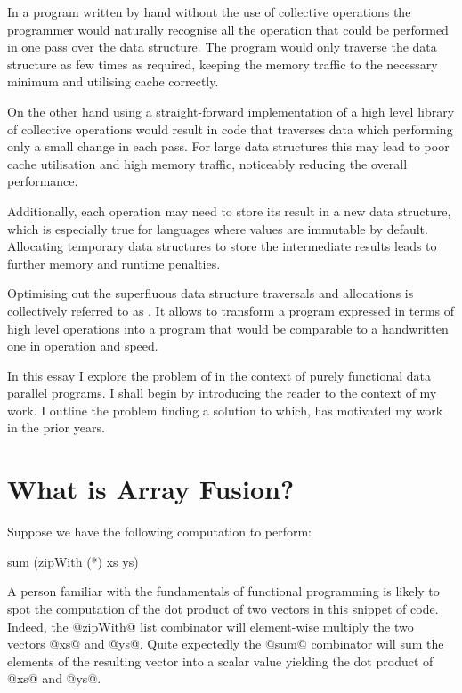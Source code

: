 \documentclass[preamble.tex]{subfiles}
\begin{document}
In a program written by hand without the use of collective operations the programmer would naturally recognise all the operation that could be performed in one pass over the data structure. The program would only traverse the data structure as few times as required, keeping the memory traffic to the necessary minimum and utilising cache correctly.

On the other hand using a straight-forward implementation of a high level library of collective operations would result in code that traverses data which performing only a small change in each pass. For large data structures this may lead to poor cache utilisation and high memory traffic, noticeably reducing the overall performance.

Additionally, each operation may need to store its result in a new data structure, which is especially true for languages where values are immutable by default. Allocating temporary data structures to store the intermediate results leads to further memory and runtime penalties.

Optimising out the superfluous data structure traversals and allocations is collectively referred to as \ifusion{}. It allows to transform a program expressed in terms of high level operations into a program that would be comparable to a handwritten one in operation and speed.

In this essay I explore the problem of  in the context of purely functional data parallel programs. I shall begin by introducing the reader to the context of my work. I outline the problem finding a solution to which, has motivated my work in the prior years.

\clearpage


\section{What is Array Fusion?}

Suppose we have the following computation to perform:

\begin{hscode}
sum (zipWith (*) xs ys)
\end{hscode}

A person familiar with the fundamentals of functional programming is likely to spot the computation of the dot product of two vectors in this snippet of \Haskell code. Indeed, the @zipWith@ list combinator\icomb{} will element-wise multiply the two vectors @xs@ and @ys@. Quite expectedly the @sum@ combinator will sum the elements of the resulting vector into a scalar value yielding the dot product of @xs@ and @ys@.
\end{document}
